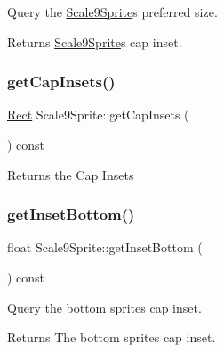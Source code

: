 Query the \hyperlink{classui_1_1Scale9Sprite}{Scale9\+Sprite}\textquotesingle{}s preferred size. 

\begin{DoxyReturn}{Returns}
\hyperlink{classui_1_1Scale9Sprite}{Scale9\+Sprite}\textquotesingle{}s cap inset. 
\end{DoxyReturn}
\mbox{\label{classui_1_1Scale9Sprite_ac8034c7282571d915a5b68bd824bbe16}} 
\subsubsection{\texorpdfstring{get\+Cap\+Insets()}{getCapInsets()}\hspace{0.1cm}{\footnotesize\ttfamily [2/2]}}
{\footnotesize\ttfamily \hyperlink{classRect}{Rect} Scale9\+Sprite\+::get\+Cap\+Insets (\begin{DoxyParamCaption}{ }\end{DoxyParamCaption}) const}

Returns the Cap Insets \mbox{\label{classui_1_1Scale9Sprite_a1807c46e0dd049481acfee6b082657ba}} 
\subsubsection{\texorpdfstring{get\+Inset\+Bottom()}{getInsetBottom()}\hspace{0.1cm}{\footnotesize\ttfamily [1/2]}}
{\footnotesize\ttfamily float Scale9\+Sprite\+::get\+Inset\+Bottom (\begin{DoxyParamCaption}{ }\end{DoxyParamCaption}) const}



Query the bottom sprite\textquotesingle{}s cap inset. 

\begin{DoxyReturn}{Returns}
The bottom sprite\textquotesingle{}s cap inset. 
\end{DoxyReturn}
\mbox{\label{classui_1_1Scale9Sprite_a874f740bd66678433e1eaa6851f6256f}} 
